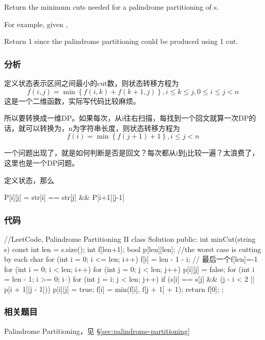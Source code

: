 Return the minimum cuts needed for a palindrome partitioning of s.

For example, given ,

Return 1 since the palindrome partitioning \code{["aa","b"]} could be produced using 1 cut.


\subsubsection{分析}
定义状态表示区间\fn{[i,j]}之间最小的cut数，则状态转移方程为 
$$
f(i,j)=\min\left\{f(i,k)+f(k+1,j)\right\}, i \leq k \leq j, 0 \leq i \leq j<n
$$
这是一个二维函数，实际写代码比较麻烦。
 
所以要转换成一维DP。如果每次，从i往右扫描，每找到一个回文就算一次DP的话，就可以转换为，n为字符串长度，则状态转移方程为
$$
f(i)=\min\left\{f(j+1)+1\right\}, i \leq j<n
$$

一个问题出现了，就是如何判断\fn{[i,j]}是否是回文？每次都从i到j比较一遍？太浪费了，这里也是一个DP问题。

定义状态，那么
\begin{Code}
P[i][j] = str[i] == str[j] && P[i+1][j-1]
\end{Code}


\subsubsection{代码}
\begin{Code}
//LeetCode, Palindrome Partitioning II
class Solution {
public:
    int minCut(string s) {
        const int len = s.size();
        int f[len+1];
        bool p[len][len];
        //the worst case is cutting by each char
        for (int i = 0; i <= len; i++)
            f[i] = len - 1 - i; // 最后一个f[len]=-1
        for (int i = 0; i < len; i++)
            for (int j = 0; j < len; j++)
                p[i][j] = false;
        for (int i = len - 1; i >= 0; i--) {
            for (int j = i; j < len; j++) {
                if (s[i] == s[j] && (j - i < 2 || p[i + 1][j - 1])) {
                    p[i][j] = true;
                    f[i] = min(f[i], f[j + 1] + 1);
                }
            }
        }
        return f[0];
    }
};
\end{Code}


\subsubsection{相关题目}
\begindot
\item Palindrome Partitioning，见 \S \ref{sec:palindrome-partitioning}
\myenddot


